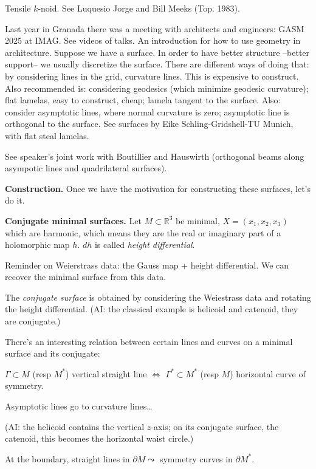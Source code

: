Tensile $k$-noid. See Luquesio Jorge and
Bill Meeks (Top. 1983).

Last year in Granada
there was a meeting with architects and
engineers: GASM 2025 at IMAG. See videos of
talks. An introduction for how to use
geometry in architecture. Suppose we have a
surface. In order to have better structure
--better support-- we usually discretize the
surface. There are different ways of doing
that: by considering lines in the grid,
curvature lines. This is expensive to
construct. Also recommended is: considering
geodesics (which minimize 
geodesic curvature); flat lamelas, easy to
construct, cheap; lamela tangent to the
surface. Also:
consider asymptotic lines, where normal
curvature is zero; asymptotic line is
orthogonal to the surface.
See surfaces by
Eike Schling-Gridshell-TU Munich, with
flat steal lamelas.

See speaker's joint work with Boutillier and
Hauswirth (orthogonal beams along asympotic
lines and quadrilateral surfaces).

\medskip\noindent
{\bf Construction.}
Once we have the motivation for
constructing these surfaces, let's do it.

\medskip\noindent
{\bf Conjugate minimal surfaces.}
Let $M \subset \mathbb{R}^3$ be minimal,
$X=(x_1,x_2,x_3)$ which are harmonic,
which means they are the real or imaginary
part of a holomorphic map $h$.
$dh$ is called {\it height differential}.

Reminder on Weierstrass data: the Gauss map
+ height differential. We can recover the
minimal surface from this data.

The {\it conjugate surface} is obtained
by considering the Weiestrass data
and rotating the height differential.
(AI: the classical example is helicoid and
catenoid, they are conjugate.)

There's an interesting relation between
certain lines and curves on a minimal
surface and its conjugate:

\begin{lemma}
\label{lemma-straight-line}
$\Gamma \subset M$ (resp $M^*$) vertical
straight line $\iff$ $\Gamma ^* \subset M^*$ 
(resp $M$) horizontal
curve of symmetry.
\end{lemma}

\noindent
Asymptotic lines go to curvature lines…

(AI: the helicoid contains the vertical
$z$-axis; on its conjugate surface, the
catenoid, this becomes the horizontal waist
circle.)

At the boundary, straight lines in $\partial
M \leadsto$ symmetry curves in $\partial
M^*$.

